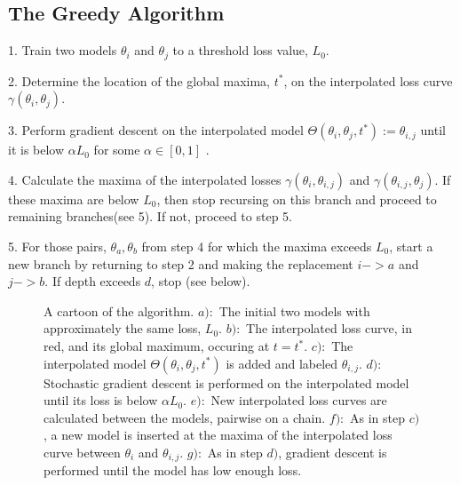 \documentclass[twocolumn,superscriptaddress,aps,prb,floatfix]{revtex4-1}
\begin{document}
 \subsection{The Greedy Algorithm}
 \label{sec:GreedyAlg}
 
 1. Train two models $\theta_i$ and $\theta_j$ to a threshold loss value, $L_0$.
 
 2. Determine the location of the global maxima, $t^*$, on the interpolated loss curve $\gamma(\theta_i, \theta_j)$. 
 
 3. Perform gradient descent on the interpolated model $\Theta (\theta_i, \theta_j, t^*) := \theta_{i,j}$ until it is below $\alpha L_0$ for some $\alpha \in [0,1]$ .
 
 4. Calculate the maxima of the interpolated losses $\gamma(\theta_i, \theta_{i,j})$ and $\gamma(\theta_{i,j}, \theta_j)$.  If these maxima are below $L_0$, then stop recursing on this branch and proceed to remaining branches(see 5).  If not, proceed to step 5.
 
 5. For those pairs, $\theta_a, \theta_b$ from step 4 for which the maxima exceeds $L_0$, start a new branch by returning to step 2 and making the replacement $i->a$ and $j->b$.  If depth exceeds $d$, stop (see below).
 
 \begin{figure}
\begin{center}
\end{center}
\caption{A cartoon of the algorithm.  $a):$ The initial two models with approximately the same loss, $L_0$. $b):$ The interpolated loss curve, in red, and its global maximum, occuring at $t=t^*$. $c):$ The interpolated model $\Theta(\theta_i, \theta_j, t^*)$ is added and labeled $\theta_{i,j}$.  $d):$ Stochastic gradient descent is performed on the interpolated model until its loss is below $\alpha L_0$. $e):$ New interpolated loss curves are calculated between the models, pairwise on a chain.  $f):$ As in step $c)$, a new model is inserted at the maxima of the interpolated loss curve between $\theta_i$ and $\theta_{i,j}$.  $g):$  As in step $d)$, gradient descent is performed until the model has low enough loss.}
\label{fig:AlgorithmFigure}
\end{figure}
 
\end{document}
